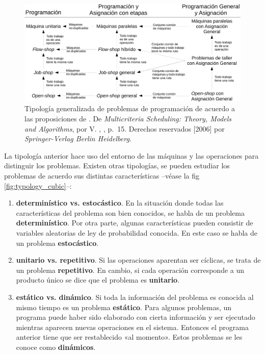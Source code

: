 \documentclass[spanish,draft,12pt,headsepline,footsepline,paper=letter]{scrreprt}
\begin{document}
\begin{figure}[hbtp]
\centering
\includegraphics[width=.9\textwidth]{media/typology_maccarthy_spanish.pdf}
\caption[Tipología basada en el contexto de máquinas y operaciones]{Tipología generalizada de problemas de programación de acuerdo a las proposiciones de \citet{maccarthy1993addressing}. De \textit{Multicriteria Scheduling: Theory, Models and Algorithms}, por V. \citeauthor{TKindt2002}, \citeyear{TKindt2002}, p.~15. Derechos reservados [2006] por \textit{Springer-Verlag Berlin Heidelberg}.}
\label{fig:typology_maccarthy}
\end{figure}

La tipología anterior hace uso del entorno de las máquinas y las operaciones para distinguir los problemas. Existen otras tipologías, se pueden estudiar los problemas de acuerdo sus distintas características –véase la fig \ref{fig:typology_cubic}–:

\begin{enumerate}[1]
\item \textbf{determinístico vs. estocástico}. En la situación donde todas las características del problema son bien conocidos, se habla de un problema \textbf{determinístico}. Por otra parte, algunas características pueden consistir de variables aleatorias de ley de probabilidad conocida. En este caso se habla de un problema \textbf{estocástico}.
\item \textbf{unitario vs. repetitivo}. Si las operaciones aparentan ser cíclicas, se trata de un problema \textbf{repetitivo}. En cambio, si cada operación corresponde a un producto único se dice que el problema es \textbf{unitario}.
\item \textbf{estático vs. dinámico}. Si toda la información del problema es conocida al mismo tiempo es un problema \textbf{estático}. Para algunos problemas, un programa puede haber sido elaborado con cierta información y ser ejecutado mientras aparecen nuevas operaciones en el sistema. Entonces el programa anterior tiene que ser restablecido «al momento». Estos problemas se les conoce como \textbf{dinámicos}.
\end{enumerate}
\end{document}
